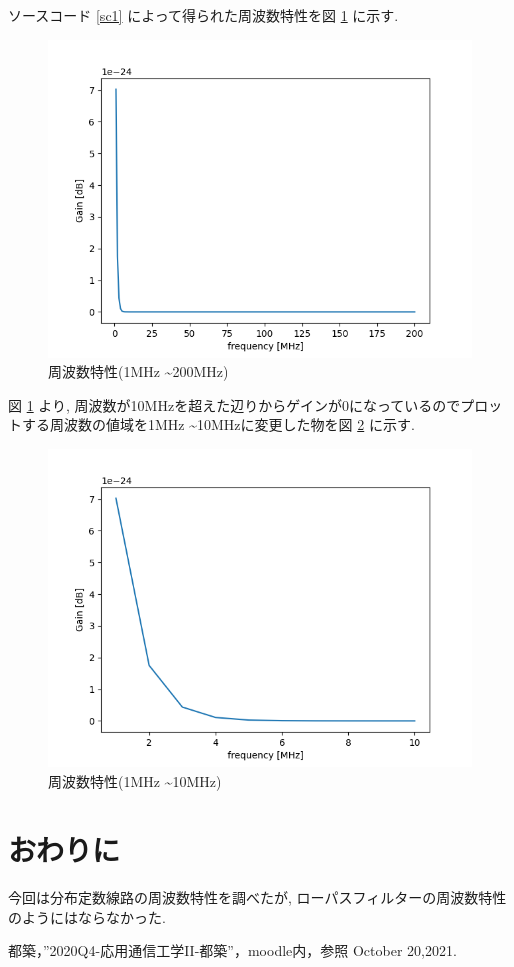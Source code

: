 \documentclass[a4j,12pt,]{jarticle}
\begin{document}
ソースコード \ref{sc1} によって得られた周波数特性を図 \ref{p4} に示す.

\begin{figure}[H]
  \begin{center}
    \includegraphics[width=140mm]{frequency_characteristic.png}
    \caption{周波数特性(1MHz \textasciitilde 200MHz)}
    \label{p4}
  \end{center}
\end{figure}

図 \ref{p4} より, 周波数が10MHzを超えた辺りからゲインが0になっているのでプロットする周波数の値域を1MHz \textasciitilde 10MHzに変更した物を図 \ref{p5} に示す.

\begin{figure}[H]
  \begin{center}
    \includegraphics[width=140mm]{frequency_characteristic_1to10.png}
    \caption{周波数特性(1MHz \textasciitilde 10MHz)}
    \label{p5}
  \end{center}
\end{figure}

\section{おわりに}

今回は分布定数線路の周波数特性を調べたが, ローパスフィルターの周波数特性のようにはならなかった.

\begin{thebibliography}{5}
  都築，”2020Q4-応用通信工学II-都築”，moodle内，参照 October 20,2021.
\end{thebibliography}
\end{document}
